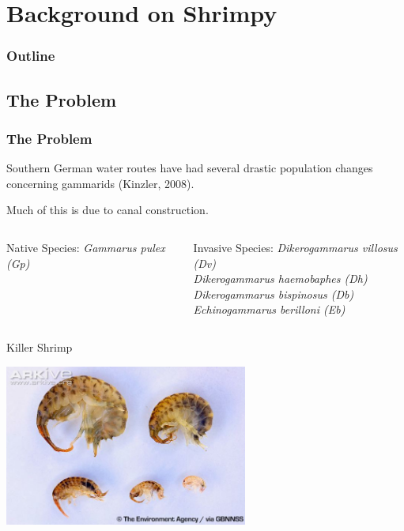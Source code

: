 \section{Background on Shrimpy}


\begin{frame}
  \frametitle{Outline}
  \tableofcontents[ currentsection ]
\end{frame}

\subsection{The Problem}

\begin{frame}
  \frametitle{The Problem}

  Southern German water routes have had several drastic population
  changes concerning gammarids (Kinzler, 2008).

  \vfill

  Much of this is due to canal construction. 

  \begin{columns}[t]
	\begin{block}{Native Species:}
	\textit{Gammarus pulex (Gp)}
	\end{block}

	\begin{block}{Invasive Species:}
    	\textit{Dikerogammarus villosus (Dv)}\\	
	\textit{Dikerogammarus haemobaphes (Dh)}\\
	\textit{Dikerogammarus bispinosus (Db)}\\
	\textit{Echinogammarus berilloni (Eb)}
	\end{block}
  \end{columns}
\end{frame}

\begin{frame}{Killer Shrimp}
  \centerline{\includegraphics[width=8cm]{img/shrimpy1}}

\end{frame}

